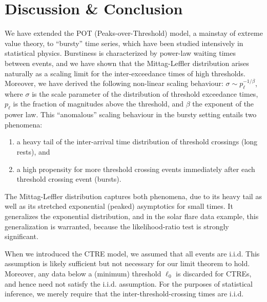 \documentclass[]{elsarticle} %
\begin{document}
\hypertarget{discussion-conclusion}{%
\section{Discussion \& Conclusion}\label{discussion-conclusion}}

We have extended the POT (Peaks-over-Threshold) model, a mainstay of
extreme value theory, to ``bursty'' time series, which have been studied
intensively in statistical physics. Burstiness is characterized by
power-law waiting times between events, and we have shown that the
Mittag-Leffler distribution arises naturally as a scaling limit for the
inter-exceedance times of high thresholds. Moreover, we have derived the
following non-linear scaling behaviour:
\(\sigma \sim p_{\ell}^{-1/\beta}\), where \(\sigma\) is the scale
parameter of the distribution of threshold exceedance times,
\(p_{\ell}\) is the fraction of magnitudes above the threshold, and
\(\beta\) the exponent of the power law. This ``anomalous'' scaling
behaviour in the bursty setting entails two phenomena:

\begin{enumerate}
\def\labelenumi{\roman{enumi})}
\item
  a heavy tail of the inter-arrival time distribution of threshold
  crossings (long rests), and
\item
  a high propensity for more threshold crossing events immediately after
  each threshold crossing event (bursts).
\end{enumerate}

The Mittag-Leffler distribution captures both phenomena, due to its
heavy tail as well as its stretched exponential (peaked) asymptotics for
small times. It generalizes the exponential distribution, and in the
solar flare data example, this generalization is warranted, because the
likelihood-ratio test is strongly significant.

When we introduced the CTRE model, we assumed that all events are i.i.d.
This assumption is likely sufficient but not necessary for our limit
theorem to hold. Moreover, any data below a (minimum) threshold
\(\ell_0\) is discarded for CTREs, and hence need not satisfy the i.i.d.
assumption. For the purposes of statistical inference, we merely require
that the inter-threshold-crossing times are i.i.d.
\end{document}
